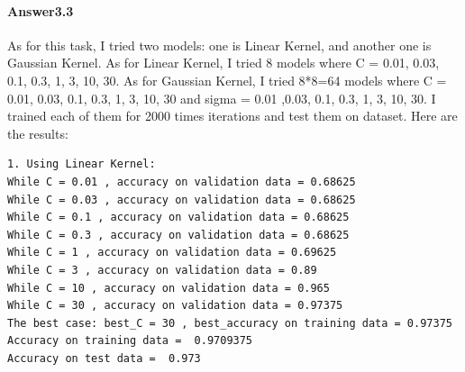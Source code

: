 \documentclass[paper=a4, fontsize=11pt]{scrartcl} %
\numberwithin{equation}{section} %
\numberwithin{figure}{section} %
\numberwithin{table}{section} %
\begin{document}
\paragraph{\textbf{Answer3.3}}
As for this task, I tried two models: one is Linear Kernel, and another one is Gaussian Kernel. As for Linear Kernel, I tried 8 models where C = 0.01, 0.03, 0.1, 0.3, 1, 3, 10, 30.
As for Gaussian Kernel, I tried 8*8=64 models where C = 0.01, 0.03, 0.1, 0.3, 1, 3, 10, 30 and sigma = 0.01 ,0.03, 0.1, 0.3, 1, 3, 10, 30. I trained each of them for 2000 times iterations and test them on dataset. Here are the results:
\begin{verbatim}
1. Using Linear Kernel:
While C = 0.01 , accuracy on validation data = 0.68625
While C = 0.03 , accuracy on validation data = 0.68625
While C = 0.1 , accuracy on validation data = 0.68625
While C = 0.3 , accuracy on validation data = 0.68625
While C = 1 , accuracy on validation data = 0.69625
While C = 3 , accuracy on validation data = 0.89
While C = 10 , accuracy on validation data = 0.965
While C = 30 , accuracy on validation data = 0.97375
The best case: best_C = 30 , best_accuracy on training data = 0.97375
Accuracy on training data =  0.9709375
Accuracy on test data =  0.973
\end{verbatim}
\end{document}

